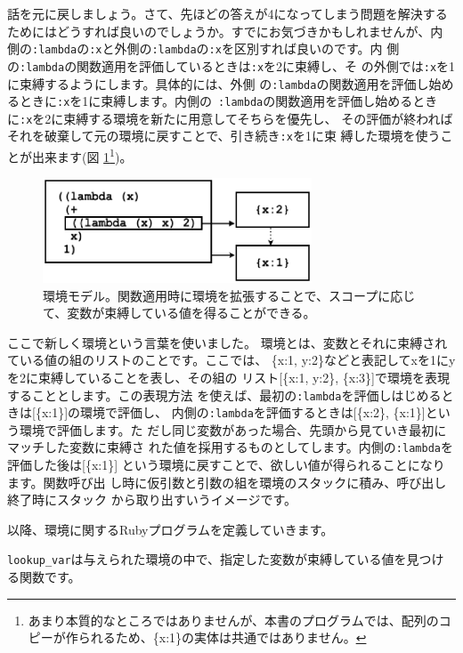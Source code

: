 話を元に戻しましょう。さて、先ほどの答えが4になってしまう問題を解決する
ためにはどうすれば良いのでしょうか。すでにお気づきかもしれませんが、内
側の{\tt :lambda}の{\tt :x}と外側の{\tt :lambda}の{\tt :x}を区別すれば良いのです。内
側の{\tt :lambda}の関数適用を評価しているときは{\tt :x}を2に束縛し、そ
の外側では{\tt :x}を1に束縛するようにします。具体的には、外側
の{\tt :lambda}の関数適用を評価し始めるときに{\tt :x}を1に束縛します。内側の{\tt
:lambda}の関数適用を評価し始めるときに{\tt :x}を2に束縛する環境を新たに用意してそちらを優先し、
その評価が終わればそれを破棄して元の環境に戻すことで、引き続き{\tt :x}を1に束
縛した環境を使うことが出来ます(図 \ref{fig:environment2}\footnote{あまり本質的なところではありませんが、本書のプログラムでは、配列のコピーが作られるため、\{x:1\}の実体は共通ではありません。})。

\begin{figure}[htbp]
\begin{center}
\includegraphics[width=80mm]{images/environment2.eps}
\end{center}
\caption{環境モデル。関数適用時に環境を拡張することで、スコープに応じて、変数が束縛している値を得ることができる。}
\label{fig:environment2}
\end{figure}

ここで新しく環境という言葉を使いました。
環境とは、変数とそれに束縛されている値の組のリストのことです。ここでは、
\{x:1, y:2\}などと表記してxを1にyを2に束縛していることを表し、その組の
リスト[\{x:1, y:2\}, \{x:3\}]で環境を表現することとします。この表現方法
を使えば、最初の{\tt :lambda}を評価しはじめるときは[\{x:1\}]の環境で評価し、
内側の{\tt :lambda}を評価するときは[\{x:2\}, \{x:1\}]という環境で評価します。た
だし同じ変数があった場合、先頭から見ていき最初にマッチした変数に束縛さ
れた値を採用するものとしてします。内側の{\tt :lambda}を評価した後は[\{x:1\}]
という環境に戻すことで、欲しい値が得られることになります。関数呼び出
し時に仮引数と引数の組を環境のスタックに積み、呼び出し終了時にスタック
から取り出すいうイメージです。

以降、環境に関するRubyプログラムを定義していきます。

{\tt lookup\_var}は与えられた環境の中で、指定した変数が束縛している値を見つける関数です。


